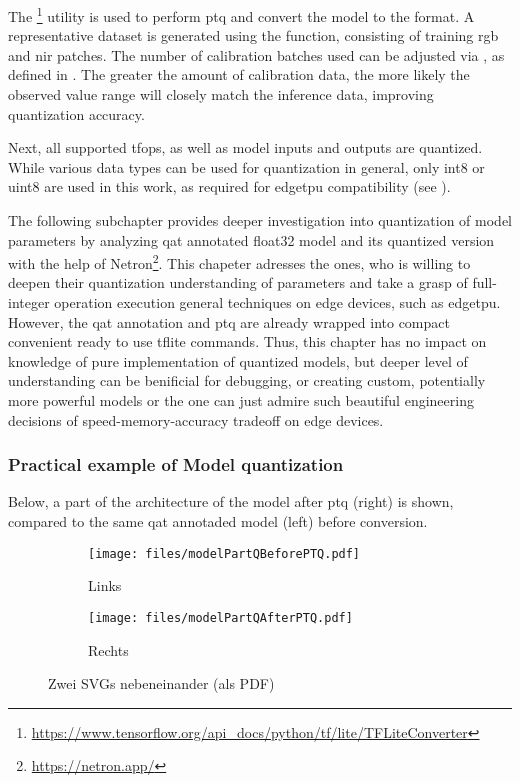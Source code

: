 {The \footnote{\url{https://www.tensorflow.org/api_docs/python/tf/lite/TFLiteConverter}} utility is used to perform \gls{ptq} and convert the model to
the  format.
A representative dataset is generated using the  function, consisting of training \gls{rgb} and \gls{nir} patches.
The number of calibration batches used can be adjusted via , as defined in .
The greater the amount of calibration data, the more likely the observed value range will closely match the inference data, improving quantization accuracy.

Next, all supported \glspl{tfop}, as well as model inputs and outputs are quantized.
While various data types can be used for quantization in general,
only \gls{int8} or \gls{uint8} are used in this work, as required for \gls{edgetpu} compatibility (see ).

The following subchapter provides deeper investigation into quantization of model parameters by
analyzing \gls{qat} annotated \gls{float32} model and its quantized version with the help of Netron\footnote{\url{https://netron.app/}}.
This chapeter adresses the ones, who is willing to deepen their quantization understanding of parameters and take a grasp of
full-integer operation execution general techniques on edge devices, such as \gls{edgetpu}.
However, the \gls{qat} annotation and \gls{ptq} are already wrapped into compact convenient ready to use \gls{tflite} commands.
Thus, this chapter has no impact on knowledge of pure implementation of quantized models,
but deeper level of understanding can be benificial for debugging,
or creating custom, potentially more powerful models or
the one can just admire such beautiful engineering decisions of speed-memory-accuracy tradeoff on edge devices.

\subsubsection*{Practical example of Model quantization}

Below, a part of the architecture of the  model after \gls{ptq} (right) is shown, compared to the same \gls{qat} annotaded model (left) before conversion.

\begin{figure}[H]
  \centering
  \begin{subfigure}[t]{0.48\textwidth}
    \centering
    \texttt{[image: files/modelPartQBeforePTQ.pdf]}
    \caption{Links}
  \end{subfigure}
  \hfill
  \begin{subfigure}[t]{0.48\textwidth}
    \centering
    \texttt{[image: files/modelPartQAfterPTQ.pdf]}
    \caption{Rechts}
  \end{subfigure}
  \caption{Zwei SVGs nebeneinander (als PDF)}
\end{figure}

}
